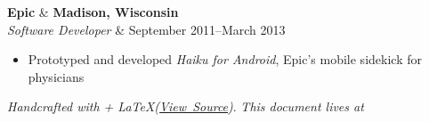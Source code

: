 \documentclass[line,margin]{res}
\begin{document}
\begin{resume}
    \begin{tabularx}
      \textbf{Epic}               & \hfill \textbf{Madison, Wisconsin}  \\
      \textit{Software Developer} & \hfill September 2011--March 2013 \\
    \end{tabularx}
    \vspace{-0.15in}
    \begin{itemize}
        \item Prototyped and developed \textit{Haiku for Android}, Epic's mobile sidekick for physicians
    \end{itemize}

\end{resume}

\vfill
\textit{Handcrafted with \heartsuit + \LaTeX (\href{https://github.com/Cheezmeister/resume/raw/master/b_luchen_resume.tex}{View\ Source})}.
\hfill
\textit{This document lives at }
\\
\end{document}
